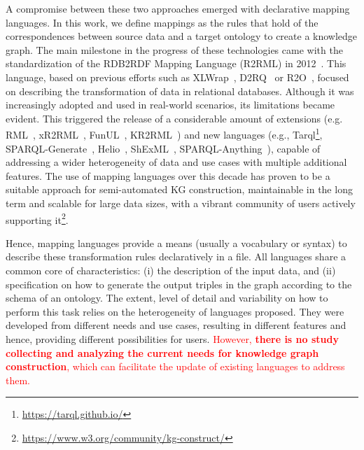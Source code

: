 A compromise between these two approaches emerged with declarative mapping languages. 
In this work, we define mappings as the rules that hold of the correspondences between source data and a target ontology to create a knowledge graph. 
The main milestone in the progress of these technologies came with the standardization of the RDB2RDF Mapping Language (R2RML) in 2012~\parencite{das2012r2rml}. 
This language, based on previous efforts such as XLWrap~\parencite{xlwrap}, D2RQ~\parencite{bizer2004d2rq} or R2O~\parencite{barrasa2004r2o}, focused on describing the transformation of data in relational databases. 
Although it was increasingly adopted and used in real-world scenarios, its limitations became evident. 
This triggered the release of a considerable amount of extensions (e.g. RML~\parencite{Dimou2014rml}, xR2RML~\parencite{michel2015xr2rml}, FunUL~\parencite{junior2016funul}, KR2RML~\parencite{slepicka2015kr2rml})
and new languages (e.g., Tarql\footnote{\url{https://tarql.github.io/}}, 
SPARQL-Generate~\parencite{Lefrancois2017sparqlgenerate}, 
Helio~\parencite{cimmino2022helio}, 
ShExML~\parencite{Garcia-Gonzalez2020shexml}, 
SPARQL-Anything~\parencite{asprino2023sparql-anything}), 
capable of addressing a wider heterogeneity of data and use cases with multiple additional features. 
The use of mapping languages over this decade has proven to be a suitable approach for semi-automated KG construction, maintainable in the long term and scalable for large data sizes, with a vibrant community of users actively supporting it\footnote{\url{https://www.w3.org/community/kg-construct/}}. 


 Hence, mapping languages provide a means (usually a vocabulary or syntax) to describe these transformation rules declaratively in a file. All languages share a common core of characteristics: (i) the description of the input data, and (ii) specification on how to generate the output triples in the graph according to the schema of an ontology. The extent, level of detail and variability on how to perform this task relies on the heterogeneity of languages proposed. They were developed from different needs and use cases, resulting in different features and hence, providing different possibilities for users. \textcolor{red}{However, \textbf{there is no study collecting and analyzing the current needs for knowledge graph construction}, which can facilitate the update of existing languages to address them. }

